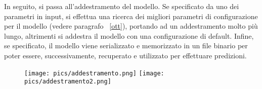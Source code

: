 \documentclass[12pt,oneside]{article}
\begin{document}
        \begin{justify}
        In seguito, si passa all’addestramento del modello. Se specificato da uno dei parametri in input, si effettua una ricerca dei migliori parametri di configurazione per il modello (vedere paragrafo ~\ref{ott}), portando ad un addestramento molto più lungo, altrimenti si addestra il modello con una configurazione di default. Infine, se specificato, il modello viene serializzato e memorizzato in un file binario per poter essere, successivamente, recuperato e utilizzato per effettuare predizioni.

        \begin{figure}[H]
        \centering
        \texttt{[image: pics/addestramento.png]}
        \texttt{[image: pics/addestramento2.png]}
        \end{figure}
        
        \end{justify}
\end{document}
